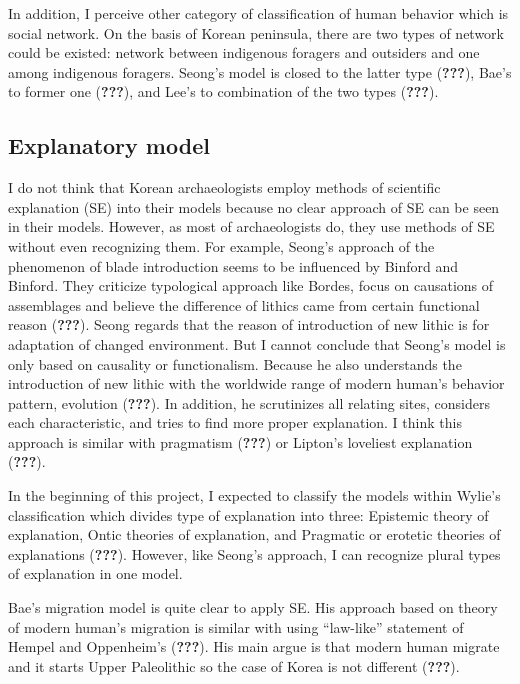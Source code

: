 \documentclass[american,man]{apa6}
\begin{document}
In addition, I perceive other category of classification of human
behavior which is social network. On the basis of Korean peninsula,
there are two types of network could be existed: network between
indigenous foragers and outsiders and one among indigenous foragers.
Seong's model is closed to the latter type ({\textbf{???}}), Bae's to
former one ({\textbf{???}}), and Lee's to combination of the two types
({\textbf{???}}).

\subsection{Explanatory model}\label{explanatory-model}

I do not think that Korean archaeologists employ methods of scientific
explanation (SE) into their models because no clear approach of SE can
be seen in their models. However, as most of archaeologists do, they use
methods of SE without even recognizing them. For example, Seong's
approach of the phenomenon of blade introduction seems to be influenced
by Binford and Binford. They criticize typological approach like Bordes,
focus on causations of assemblages and believe the difference of lithics
came from certain functional reason ({\textbf{???}}). Seong regards that
the reason of introduction of new lithic is for adaptation of changed
environment. But I cannot conclude that Seong's model is only based on
causality or functionalism. Because he also understands the introduction
of new lithic with the worldwide range of modern human's behavior
pattern, evolution ({\textbf{???}}). In addition, he scrutinizes all
relating sites, considers each characteristic, and tries to find more
proper explanation. I think this approach is similar with pragmatism
({\textbf{???}}) or Lipton's loveliest explanation ({\textbf{???}}).

In the beginning of this project, I expected to classify the models
within Wylie's classification which divides type of explanation into
three: Epistemic theory of explanation, Ontic theories of explanation,
and Pragmatic or erotetic theories of explanations ({\textbf{???}}).
However, like Seong's approach, I can recognize plural types of
explanation in one model.

Bae's migration model is quite clear to apply SE. His approach based on
theory of modern human's migration is similar with using
\enquote{law-like} statement of Hempel and Oppenheim's ({\textbf{???}}).
His main argue is that modern human migrate and it starts Upper
Paleolithic so the case of Korea is not different ({\textbf{???}}).
\end{document}
